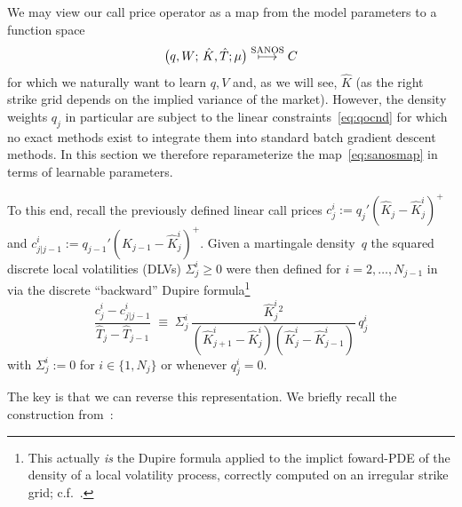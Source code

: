 \documentclass[11pt,a4paper]{article}
\DeclareRobustCommand{\supstack}[2]{\stackrel{\mbox{{\scriptsize ${#1}$}}}{ {#2} }}     %
\begin{document}
We may view our call price operator as a map from the model
parameters to a function space
\begin{equation}\label{eq:sanosmap}
    \big( q, W;\, \hat K,\hat T; \mu\big) \supstack{\mathrm{SANOS}}\longmapsto C    
\end{equation}
for which we naturally want to learn $q,V$ and, as we will see, $\hat K$ (as the right strike grid
depends on the implied variance of the market).
However, the density weights $q_j$ in particular are subject to the linear constraints~\eqref{eq:qocnd}
for which no exact methods exist to integrate them into standard batch gradient descent methods.
In this section we therefore reparameterize the map~\eqref{eq:sanosmap} in terms
of learnable parameters.

To this end, recall the previously defined linear call prices
$c_j^i := q_j'(\hat K_j - \hat K_j^i)^+$ and
$c_{j|j-1}^i := q_{j-1}'(\hat K_{j-1} - \hat K_j^i)^+$.
Given a martingale density~$q$ the squared discrete local volatilities (DLVs) $\Sigma_j^i \geq 0$ were then defined for $i=2,\ldots,N_{j-1}$ in~\cite{DLV}
via the discrete ``backward''
Dupire formula\footnote{
    This actually \emph{is} the Dupire formula applied to the implict foward-PDE of the density of a local volatility process, correctly computed
    on an irregular strike grid; c.f.~\cite{DLV}.
}
\begin{equation}
  \label{eq:dlv_def}
  \frac{ c_j^i - c_{j|j-1}^i }{\hat T_j-\hat T_{j-1} }
  \;\equiv\;
  \Sigma_j^i\,
  \frac{\hat K_j^i{}^2 }{(\hat K_{j+1}^i - \hat K_j^i)(\hat K_j^i - \hat K_{j-1}^i)}
  \,q_j^i 
\end{equation}
with $\Sigma_j^i := 0$ for $i\in\{1,N_j\}$ or whenever $q_j^i= 0$.

The key is that we can reverse this representation. We briefly recall the construction
from~\cite{SANOS2026}: 
\end{document}
